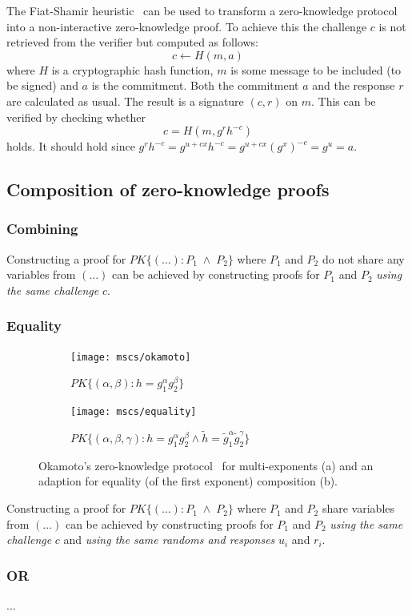 The Fiat-Shamir heuristic~\cite{FiatShamir1987} can be used to transform a zero-knowledge protocol into a non-interactive zero-knowledge proof. To achieve this the challenge $c$ is not retrieved from the verifier but computed as follows: $$c \leftarrow H(m,a)$$ where $H$ is a cryptographic hash function, $m$ is some message to be included (to be signed) and $a$ is the commitment. Both the commitment $a$ and the response $r$ are calculated as usual. The result is a signature $(c,r)$ on $m$. This can be verified by checking whether $$c = H(m, g^r h^{-c})$$ holds. It should hold since $g^r h^{-c} = g^{u + cx} h^{-c} = g^{u + cx} (g^x)^{-c} = g^u = a$.

\subsection{Composition of zero-knowledge proofs}

\subsubsection{Combining}

Constructing a proof for $PK\{(\dots) : P_1 \;\land\; P_2 \}$ where $P_1$ and $P_2$ do not share any variables from $(\dots)$ can be achieved by constructing proofs for $P_1$ and $P_2$ \emph{using the same challenge} $c$.

\subsubsection{Equality}

\begin{figure}
  \centering
  \begin{subfigure}[b]{0.45\textwidth}
    \texttt{[image: mscs/okamoto]}
    \caption{$PK\{(\alpha, \beta) : h = g_1^\alpha g_2^\beta \}$}
    \label{msc:okamoto}
  \end{subfigure}
  \quad
  \begin{subfigure}[b]{0.45\textwidth}
    \texttt{[image: mscs/equality]}
    \caption{$PK\{(\alpha, \beta, \gamma) : h = g_1^\alpha g_2^\beta \land \tilde{h} = \tilde{g}_1^\alpha \tilde{g}_2^\gamma\}$}
    \label{msc:equality}
  \end{subfigure}
  \caption{Okamoto's zero-knowledge protocol~\cite{Okamoto1993} for multi-exponents (a) and an adaption for equality (of the first exponent) composition (b).}
  \label{fig:okamoto}
\end{figure}

Constructing a proof for $PK\{(\dots) : P_1 \;\land\; P_2 \}$ where $P_1$ and $P_2$ share variables from $(\dots)$ can be achieved by constructing proofs for $P_1$ and $P_2$ \emph{using the same challenge} $c$ and \emph{using the same randoms and responses} $u_i$ and $r_i$.


\subsubsection{OR} ...
